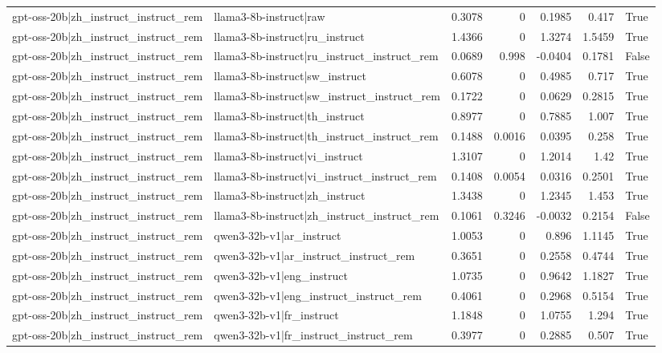 \begin{table}
\begin{tabular}{l l r r r r l}
gpt-oss-20b|zh_instruct_instruct_rem & llama3-8b-instruct|raw & 0.3078 & 0 & 0.1985 & 0.417 & True \\
gpt-oss-20b|zh_instruct_instruct_rem & llama3-8b-instruct|ru_instruct & 1.4366 & 0 & 1.3274 & 1.5459 & True \\
gpt-oss-20b|zh_instruct_instruct_rem & llama3-8b-instruct|ru_instruct_instruct_rem & 0.0689 & 0.998 & -0.0404 & 0.1781 & False \\
gpt-oss-20b|zh_instruct_instruct_rem & llama3-8b-instruct|sw_instruct & 0.6078 & 0 & 0.4985 & 0.717 & True \\
gpt-oss-20b|zh_instruct_instruct_rem & llama3-8b-instruct|sw_instruct_instruct_rem & 0.1722 & 0 & 0.0629 & 0.2815 & True \\
gpt-oss-20b|zh_instruct_instruct_rem & llama3-8b-instruct|th_instruct & 0.8977 & 0 & 0.7885 & 1.007 & True \\
gpt-oss-20b|zh_instruct_instruct_rem & llama3-8b-instruct|th_instruct_instruct_rem & 0.1488 & 0.0016 & 0.0395 & 0.258 & True \\
gpt-oss-20b|zh_instruct_instruct_rem & llama3-8b-instruct|vi_instruct & 1.3107 & 0 & 1.2014 & 1.42 & True \\
gpt-oss-20b|zh_instruct_instruct_rem & llama3-8b-instruct|vi_instruct_instruct_rem & 0.1408 & 0.0054 & 0.0316 & 0.2501 & True \\
gpt-oss-20b|zh_instruct_instruct_rem & llama3-8b-instruct|zh_instruct & 1.3438 & 0 & 1.2345 & 1.453 & True \\
gpt-oss-20b|zh_instruct_instruct_rem & llama3-8b-instruct|zh_instruct_instruct_rem & 0.1061 & 0.3246 & -0.0032 & 0.2154 & False \\
gpt-oss-20b|zh_instruct_instruct_rem & qwen3-32b-v1|ar_instruct & 1.0053 & 0 & 0.896 & 1.1145 & True \\
gpt-oss-20b|zh_instruct_instruct_rem & qwen3-32b-v1|ar_instruct_instruct_rem & 0.3651 & 0 & 0.2558 & 0.4744 & True \\
gpt-oss-20b|zh_instruct_instruct_rem & qwen3-32b-v1|eng_instruct & 1.0735 & 0 & 0.9642 & 1.1827 & True \\
gpt-oss-20b|zh_instruct_instruct_rem & qwen3-32b-v1|eng_instruct_instruct_rem & 0.4061 & 0 & 0.2968 & 0.5154 & True \\
gpt-oss-20b|zh_instruct_instruct_rem & qwen3-32b-v1|fr_instruct & 1.1848 & 0 & 1.0755 & 1.294 & True \\
gpt-oss-20b|zh_instruct_instruct_rem & qwen3-32b-v1|fr_instruct_instruct_rem & 0.3977 & 0 & 0.2885 & 0.507 & True \\

\end{tabular}
\end{table}
